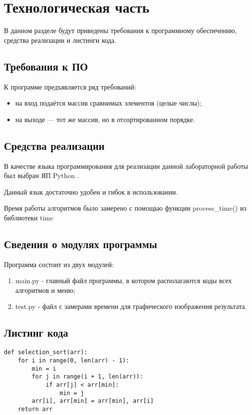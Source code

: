 \chapter{Технологическая часть}

В данном разделе будут приведены требования к программному обеспечению, средства реализации и листинги кода.

\section{Требования к ПО}

К программе предъявляется ряд требований:
\begin{itemize}
	\item на вход подаётся массив сравнимых элементов (целые числы);
	\item на выходе — тот же массив, но в отсортированном порядке.
\end{itemize}

\section{Средства реализации}

В качестве языка программирования для реализации данной лабораторной работы был выбран ЯП Python \cite{pythonlang}. 

Данный язык достаточно удобен и гибок в использовании. 

Время работы алгоритмов было замерено с помощью функции process\_time() из библиотеки time \cite{pythonlangtime}

\section{Сведения о модулях программы}
Программа состоит из двух модулей:
\begin{enumerate}
	\item main.py - главный файл программы, в котором располагаются коды всех алгоритмов и меню;
	\item test.py - файл с замерами времени для графического изображения результата.
\end{enumerate}


\section{Листинг кода}


\begin{lstlisting}[label=lst:vyb_sort,caption=Алгоритм сортировки выбором]
def selection_sort(arr):
	for i in range(0, len(arr) - 1):
		min = i
		for j in range(i + 1, len(arr)):
			if arr[j] < arr[min]:
				min = j
		arr[i], arr[min] = arr[min], arr[i]
	return arr
\end{lstlisting}

